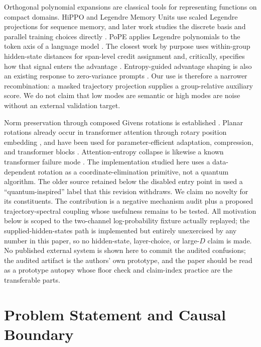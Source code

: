 \documentclass{article}
\begin{document}
Orthogonal polynomial expansions are classical tools for representing
functions on compact domains.  HiPPO and Legendre Memory Units use scaled
Legendre projections for sequence memory, and later work studies the discrete
basis and parallel training choices directly
\citep{gu2020hippo,voelker2019lmu,chilkuri2021parallelizing}.  PoPE applies
Legendre polynomials to the token axis of a language model
\citep{aggarwal2024pope}.  The closest work by purpose uses within-group
hidden-state distances for span-level credit assignment and, critically,
specifies how that signal enters the advantage \citep{chen2026shear}.
Entropy-guided advantage shaping is also an existing response to zero-variance
prompts \citep{le2025noprompt}.  Our use is therefore a narrower recombination:
a masked trajectory projection supplies a group-relative auxiliary score.  We
do not claim that low modes are semantic or high modes are noise without an
external validation target.

Norm preservation through composed Givens rotations is established
\citep{dorobantu2016dizzyrnn,jing2017eunn,frerix2019givens}.  Planar rotations
already occur in transformer attention through rotary position embedding
\citep{su2024roformer}, and have been used for parameter-efficient adaptation,
compression, and transformer blocks
\citep{ma2024qoft,su2025rotatekv,abuayyash2026threephase}.  Attention-entropy
collapse is likewise a known transformer failure mode \citep{zhai2023entropy}.
The implementation studied here uses a data-dependent rotation as a
coordinate-elimination primitive, not a quantum algorithm. The older source
retained below the disabled entry point in 
used a ``quantum-inspired'' label that this revision withdraws. We claim no
novelty for its constituents. The contribution is a negative mechanism audit
plus a proposed trajectory-spectral coupling whose usefulness remains to be tested.
All motivation below is scoped to the two-channel log-probability fixture
actually replayed; the supplied-hidden-states path is implemented but
entirely unexercised by any number in this paper, so no hidden-state,
layer-choice, or large-$D$ claim is made. No published external system is
shown here to commit the audited confusions; the audited artifact is the
authors' own prototype, and the paper should be read as a prototype
autopsy whose floor check and claim-index practice are the transferable
parts.

\section{Problem Statement and Causal Boundary}
\label{sec:problem}
\end{document}
